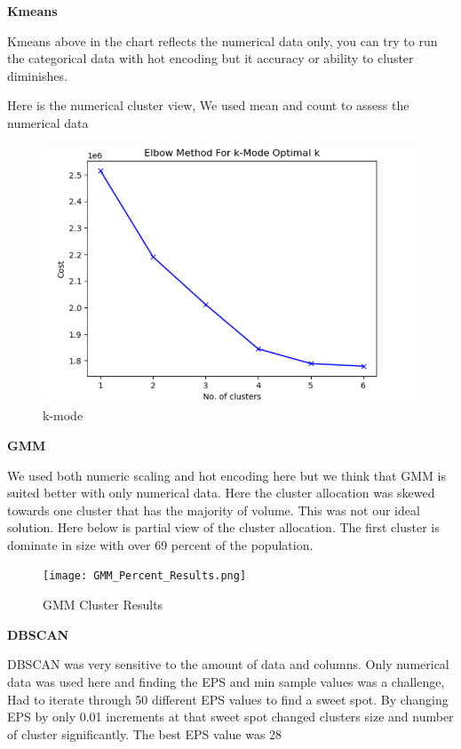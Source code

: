 \documentclass[conference]{IEEEtran}
\begin{document}
\begin{center} 
\textbf{Kmeans} 
\end{center}
Kmeans above in the chart reflects the numerical data only,  you can try to run the categorical data with hot encoding but it accuracy or ability to cluster diminishes.

Here is the numerical cluster view,  We used mean and count to assess the numerical data

\begin{figure}[!h]
	\includegraphics[width=\linewidth]{k_mode_elbow.png}
	\caption{k-mode}
	\label{fig: Kmode Elbow Chart}
 \end{figure}


\begin{center} 
\textbf{GMM} 
\end{center}
We used both numeric scaling and hot encoding here but we think that GMM is suited better with only numerical data.  Here the cluster allocation was skewed towards one cluster that has the majority of volume.  This was not our ideal solution.  Here below is partial view of the cluster allocation.  The first cluster is dominate in size with over 69 percent of the population. 

\begin{figure}[!h]
	\texttt{[image: GMM\_Percent\_Results.png]}
	\caption{GMM Cluster Results}
	\label{fig: GMM Cluster Results (Partial View)}
 \end{figure}
\begin{center} 

\textbf{DBSCAN} 
\end{center}
DBSCAN was very sensitive to the amount of data and columns.  Only numerical data was used here and finding the EPS and min sample values was a challenge,  Had to iterate through 50 different EPS values to find a sweet spot.  By changing EPS by only 0.01 increments at that sweet spot changed clusters size and number of cluster significantly. The best EPS value was 28
\end{document}
